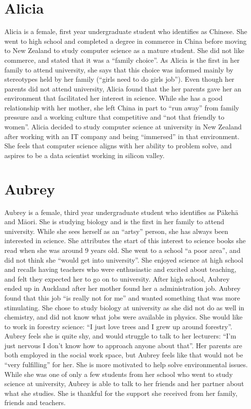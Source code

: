 \section{Alicia}
Alicia is a female, first year undergraduate student who identifies as Chinese. She went to high school and completed a degree in commerce in China before moving to New Zealand to study computer science as a mature student. She did not like commerce, and stated that it was a ``family choice''. As Alicia is the first in her family to attend university, she says that this choice was informed mainly by stereotypes held by her family (``girls need to do girls job''). Even though her parents did not attend university, Alicia found that the her parents gave her an environment that facilitated her interest in science. While she has a good relationship with her mother, she left China in part to ``run away'' from family pressure and a working culture that competitive and ``not that friendly to women''. Alicia decided to study computer science at university in New Zealand after working with an IT company and being ``immersed'' in that environment. She feels that computer science aligns with her ability to problem solve, and aspires to be a data scientist working in silicon valley.


\section{Aubrey}
Aubrey is a female, third year undergraduate student who identifies as P\={a}keh\={a} and M\={a}ori. She is studying biology and is the first in her family to attend university. While she sees herself as an ``artsy'' person, she has always been interested in science. She attributes the start of this interest to science books she read when she was around 9 years old. She went to a school ``a poor area'', and did not think she ``would get into university''. She enjoyed science at high school and recalls having teachers who were enthusiastic and excited about teaching, and felt they expected her to go on to university. After high school, Aubrey ended up in Auckland after her mother found her a administration job. Aubrey found that this job ``is really not for me'' and wanted something that was more stimulating. She chose to study biology at university as she did not do as well in chemistry, and did not know what jobs were available in physics. She would like to work in forestry science: ``I just love trees and I grew up around forestry''. Aubrey feels she is quite shy, and would struggle to talk to her lecturers: ``I’m just nervous I don’t know how to approach anyone about that''. Her parents are both employed in the social work space, but Aubrey feels like that would not be ``very fulfilling'' for her. She is more motivated to help solve environmental issues. While she was one of only a few students from her school who went to study science at university, Aubrey is able to talk to her friends and her partner about what she studies. She is thankful for the support she received from her family, friends and teachers. 

